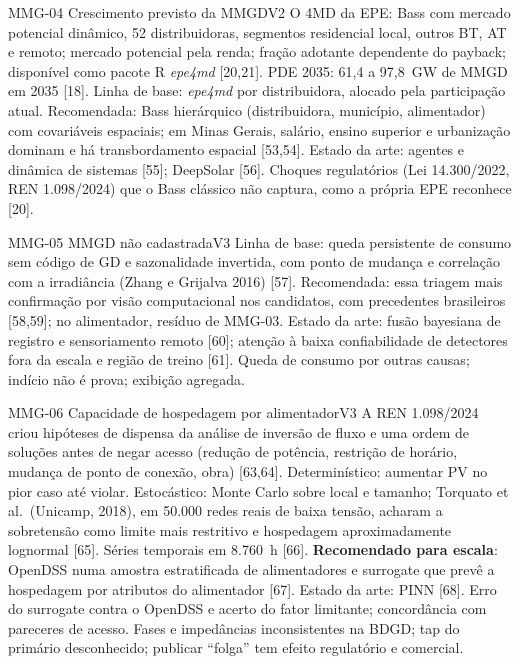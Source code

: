 \begin{ficha}{MMG-04 \textperiodcentered{} Crescimento previsto da MMGD}{V2}
 O 4MD da EPE: Bass com mercado potencial
dinâmico, 52 distribuidoras, segmentos residencial local, outros BT, AT e
remoto; mercado potencial pela renda; fração adotante dependente do payback;
disponível como pacote R \emph{epe4md} [20,21]. PDE 2035: 61,4 a 97,8~GW de
MMGD em 2035 [18].
 Linha de base: \emph{epe4md} por distribuidora, alocado
pela participação atual. Recomendada: Bass hierárquico (distribuidora,
município, alimentador) com covariáveis espaciais; em Minas Gerais, salário,
ensino superior e urbanização dominam e há transbordamento espacial [53,54].
Estado da arte: agentes e dinâmica de sistemas [55]; DeepSolar [56].
 Choques regulatórios (Lei 14.300/2022, REN 1.098/2024) que
o Bass clássico não captura, como a própria EPE reconhece [20].
\end{ficha}

\begin{ficha}{MMG-05 \textperiodcentered{} MMGD não cadastrada}{V3}
 Linha de base: queda persistente de consumo sem código de
GD e sazonalidade invertida, com ponto de mudança e correlação com a
irradiância (Zhang e Grijalva 2016) [57]. Recomendada: essa triagem mais
confirmação por visão computacional nos candidatos, com precedentes
brasileiros [58,59]; no alimentador, resíduo de MMG-03. Estado da arte: fusão
bayesiana de registro e sensoriamento remoto [60]; atenção à baixa
confiabilidade de detectores fora da escala e região de treino [61].
 Queda de consumo por outras causas; indício não é prova;
exibição agregada.
\end{ficha}

\begin{ficha}{MMG-06 \textperiodcentered{} Capacidade de hospedagem por alimentador}{V3}
 A REN 1.098/2024 criou hipóteses de dispensa da análise de
inversão de fluxo e uma ordem de soluções antes de negar acesso (redução de
potência, restrição de horário, mudança de ponto de conexão, obra) [63,64].
 Determinístico: aumentar PV no pior caso até violar.
Estocástico: Monte Carlo sobre local e tamanho; Torquato et al.\ (Unicamp,
2018), em 50.000 redes reais de baixa tensão, acharam a sobretensão como
limite mais restritivo e hospedagem aproximadamente lognormal [65]. Séries
temporais em 8.760~h [66]. \textbf{Recomendado para escala}: OpenDSS numa
amostra estratificada de alimentadores e surrogate que prevê a hospedagem por
atributos do alimentador [67]. Estado da arte: PINN [68].
 Erro do surrogate contra o OpenDSS e acerto do fator
limitante; concordância com pareceres de acesso.
 Fases e impedâncias inconsistentes na BDGD; tap do
primário desconhecido; publicar ``folga'' tem efeito regulatório e comercial.
\end{ficha}

